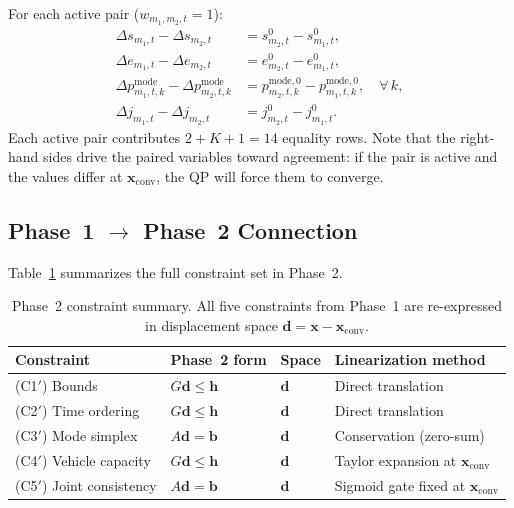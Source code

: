 \documentclass[11pt,a4paper]{article}
\newcommand{\xconv}{\mathbf{x}_{\mathrm{conv}}}
\begin{document}
For each active pair ($w_{m_1,m_2,t} = 1$):
\begin{align}
    \Delta s_{m_1,t} - \Delta s_{m_2,t} &= s^0_{m_2,t} - s^0_{m_1,t}, \label{eq:joint_start_d}\\
    \Delta e_{m_1,t} - \Delta e_{m_2,t} &= e^0_{m_2,t} - e^0_{m_1,t}, \label{eq:joint_end_d}\\
    \Delta p^{\mathrm{mode}}_{m_1,t,k} - \Delta p^{\mathrm{mode}}_{m_2,t,k} &= p^{\mathrm{mode},0}_{m_2,t,k} - p^{\mathrm{mode},0}_{m_1,t,k}, \quad \forall\, k, \label{eq:joint_mode_d}\\
    \Delta j_{m_1,t} - \Delta j_{m_2,t} &= j^0_{m_2,t} - j^0_{m_1,t}. \label{eq:joint_prob_d}
\end{align}
Each active pair contributes $2 + K + 1 = 14$ equality rows.
Note that the right-hand sides drive the paired variables toward agreement: if the pair is active and the values differ at $\xconv$, the QP will force them to converge.

\subsection{Phase~1 $\to$ Phase~2 Connection}

Table~\ref{tab:linearization} summarizes the full constraint set in Phase~2.

\begin{table}[ht]
\centering
\caption{Phase~2 constraint summary. All five constraints from Phase~1 are re-expressed in displacement space $\mathbf{d} = \mathbf{x} - \xconv$.}
\label{tab:linearization}
\begin{tabular}{@{}llll@{}}
\toprule
Constraint & Phase~2 form & Space & Linearization method \\
\midrule
(C1$'$) Bounds & $G\mathbf{d} \leq \mathbf{h}$ & $\mathbf{d}$ & Direct translation \\
(C2$'$) Time ordering & $G\mathbf{d} \leq \mathbf{h}$ & $\mathbf{d}$ & Direct translation \\
(C3$'$) Mode simplex & $A\mathbf{d} = \mathbf{b}$ & $\mathbf{d}$ & Conservation (zero-sum) \\
(C4$'$) Vehicle capacity & $G\mathbf{d} \leq \mathbf{h}$ & $\mathbf{d}$ & Taylor expansion at $\xconv$ \\
(C5$'$) Joint consistency & $A\mathbf{d} = \mathbf{b}$ & $\mathbf{d}$ & Sigmoid gate fixed at $\xconv$ \\
\bottomrule
\end{tabular}
\end{table}
\end{document}
